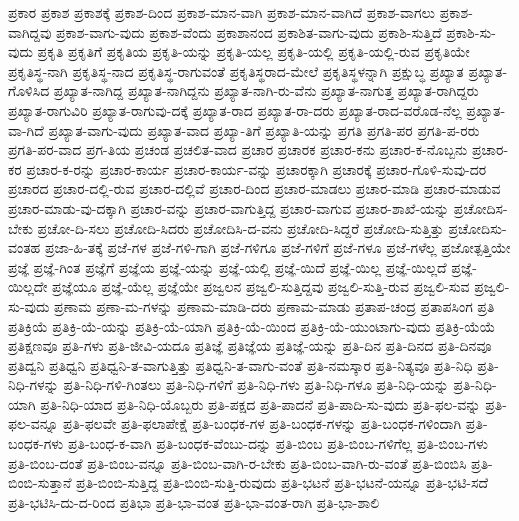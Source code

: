{ಪ್ರಕಾರ
ಪ್ರಕಾಶ
ಪ್ರಕಾಶಕ್ಕೆ
ಪ್ರಕಾಶ-ದಿಂದ
ಪ್ರಕಾಶ-ಮಾನ-ವಾಗಿ
ಪ್ರಕಾಶ-ಮಾನ-ವಾಗಿದೆ
ಪ್ರಕಾಶ-ವಾಗಲು
ಪ್ರಕಾಶ-ವಾಗಿದ್ದವು
ಪ್ರಕಾಶ-ವಾಗು-ವುದು
ಪ್ರಕಾಶ-ವೆಂದು
ಪ್ರಕಾಶಾನಂದ
ಪ್ರಕಾಶಿತ-ವಾಗು-ವುದು
ಪ್ರಕಾಶಿ-ಸುತ್ತಿದೆ
ಪ್ರಕಾಶಿ-ಸು-ವುದು
ಪ್ರಕೃತಿ
ಪ್ರಕೃತಿಗೆ
ಪ್ರಕೃತಿಯ
ಪ್ರಕೃತಿ-ಯನ್ನು
ಪ್ರಕೃತಿ-ಯಲ್ಲ
ಪ್ರಕೃತಿ-ಯಲ್ಲಿ
ಪ್ರಕೃತಿ-ಯಲ್ಲಿ-ರುವ
ಪ್ರಕೃತಿಯೇ
ಪ್ರಕೃತಿಸ್ಥ-ನಾಗಿ
ಪ್ರಕೃತಿಸ್ಥ-ನಾದ
ಪ್ರಕೃತಿಸ್ಥ-ರಾಗುವಂತೆ
ಪ್ರಕೃತಿಸ್ಥರಾದ-ಮೇಲೆ
ಪ್ರಕೃತಿಸ್ಥಳನ್ನಾಗಿ
ಪ್ರಕ್ಷುಬ್ಧ
ಪ್ರಖ್ಯಾತ
ಪ್ರಖ್ಯಾತ-ಗೊಳಿಸಿದ
ಪ್ರಖ್ಯಾತ-ನಾಗಿದ್ದ
ಪ್ರಖ್ಯಾತ-ನಾಗಿದ್ದನು
ಪ್ರಖ್ಯಾತ-ನಾಗಿ-ರು-ವೆನು
ಪ್ರಖ್ಯಾತ-ನಾಗುತ್ತ
ಪ್ರಖ್ಯಾತ-ರಾಗಿದ್ದರು
ಪ್ರಖ್ಯಾತ-ರಾಗುವಿರಿ
ಪ್ರಖ್ಯಾತ-ರಾಗುವು-ದಕ್ಕೆ
ಪ್ರಖ್ಯಾತ-ರಾದ
ಪ್ರಖ್ಯಾತ-ರಾ-ದರು
ಪ್ರಖ್ಯಾತ-ರಾದ-ವರೊಡ-ನೆಲ್ಲ
ಪ್ರಖ್ಯಾತ-ವಾ-ಗಿದೆ
ಪ್ರಖ್ಯಾತ-ವಾಗು-ವುದು
ಪ್ರಖ್ಯಾತ-ವಾದ
ಪ್ರಖ್ಯಾ-ತಿಗೆ
ಪ್ರಖ್ಯಾತಿ-ಯನ್ನು
ಪ್ರಗತಿ
ಪ್ರಗತಿ-ಪರ
ಪ್ರಗತಿ-ಪ-ರರು
ಪ್ರಗತಿ-ಪರ-ವಾದ
ಪ್ರಗ-ತಿಯ
ಪ್ರಚಂಡ
ಪ್ರಚಲಿತ-ವಾದ
ಪ್ರಚಾರ
ಪ್ರಚಾರಕ
ಪ್ರಚಾರ-ಕನು
ಪ್ರಚಾರ-ಕ-ನೊಬ್ಬನು
ಪ್ರಚಾರ-ಕರ
ಪ್ರಚಾರ-ಕ-ರನ್ನು
ಪ್ರಚಾರ-ಕಾರ್ಯ
ಪ್ರಚಾರ-ಕಾರ್ಯ-ವನ್ನು
ಪ್ರಚಾರಕ್ಕಾಗಿ
ಪ್ರಚಾರಕ್ಕೆ
ಪ್ರಚಾರ-ಗೊಳಿ-ಸುವು-ದರ
ಪ್ರಚಾರದ
ಪ್ರಚಾರ-ದಲ್ಲಿ-ರುವ
ಪ್ರಚಾರ-ದಲ್ಲಿವೆ
ಪ್ರಚಾರ-ದಿಂದ
ಪ್ರಚಾರ-ಮಾಡಲು
ಪ್ರಚಾರ-ಮಾಡಿ
ಪ್ರಚಾರ-ಮಾಡುವ
ಪ್ರಚಾರ-ಮಾಡು-ವು-ದಕ್ಕಾಗಿ
ಪ್ರಚಾರ-ವನ್ನು
ಪ್ರಚಾರ-ವಾಗುತ್ತಿದ್ದ
ಪ್ರಚಾರ-ವಾಗುವ
ಪ್ರಚಾರ-ಶಾಖೆ-ಯನ್ನು
ಪ್ರಚೋದಿಸ-ಬೇಕು
ಪ್ರಚೋ-ದಿ-ಸಲು
ಪ್ರಚೋದಿ-ಸಿದರು
ಪ್ರಚೋದಿಸಿ-ದ-ವನು
ಪ್ರಚೋದಿ-ಸಿದ್ದರೆ
ಪ್ರಚೋದಿ-ಸುತ್ತಿತ್ತು
ಪ್ರಚೋದಿಸು-ವಂತಹ
ಪ್ರಜಾ-ಹಿ-ತಕ್ಕೆ
ಪ್ರಜೆ-ಗಳ
ಪ್ರಜೆ-ಗಳಿ-ಗಾಗಿ
ಪ್ರಜೆ-ಗಳಿಗೂ
ಪ್ರಜೆ-ಗಳಿಗೆ
ಪ್ರಜೆ-ಗಳೂ
ಪ್ರಜೆ-ಗಳೆಲ್ಲ
ಪ್ರಜೋತ್ಪತ್ತಿಯೇ
ಪ್ರಜ್ಞೆ
ಪ್ರಜ್ಞೆ-ಗಿಂತ
ಪ್ರಜ್ಞೆಗೆ
ಪ್ರಜ್ಞೆಯ
ಪ್ರಜ್ಞೆ-ಯನ್ನು
ಪ್ರಜ್ಞೆ-ಯಲ್ಲಿ
ಪ್ರಜ್ಞೆ-ಯಿದೆ
ಪ್ರಜ್ಞೆ-ಯಿಲ್ಲ
ಪ್ರಜ್ಞೆ-ಯಿಲ್ಲದೆ
ಪ್ರಜ್ಞೆ-ಯಿಲ್ಲದೇ
ಪ್ರಜ್ಞೆಯೂ
ಪ್ರಜ್ಞೆ-ಯೆಲ್ಲ
ಪ್ರಜ್ಞೆಯೇ
ಪ್ರಜ್ವಲನ
ಪ್ರಜ್ವಲಿ-ಸುತ್ತಿದ್ದವು
ಪ್ರಜ್ವಲಿ-ಸುತ್ತಿ-ರುವ
ಪ್ರಜ್ವಲಿ-ಸುವ
ಪ್ರಜ್ವಲಿ-ಸು-ವುದು
ಪ್ರಣಾಮ
ಪ್ರಣಾ-ಮ-ಗಳನ್ನು
ಪ್ರಣಾಮ-ಮಾಡಿ-ದರು
ಪ್ರಣಾಮ-ಮಾಡು
ಪ್ರತಾಪ-ಚಂದ್ರ
ಪ್ರತಾಪಸಿಂಗ
ಪ್ರತಿ
ಪ್ರತಿಕ್ರಿಯೆ
ಪ್ರತಿಕ್ರಿ-ಯೆ-ಯನ್ನು
ಪ್ರತಿಕ್ರಿ-ಯೆ-ಯಾಗಿ
ಪ್ರತಿಕ್ರಿ-ಯೆ-ಯಿಂದ
ಪ್ರತಿಕ್ರಿ-ಯೆ-ಯುಂಟಾಗು-ವುದು
ಪ್ರತಿಕ್ರಿ-ಯೆಯೆ
ಪ್ರತಿಕ್ಷಣವೂ
ಪ್ರತಿ-ಗಳು
ಪ್ರತಿ-ಜೀವಿ-ಯದೂ
ಪ್ರತಿಜ್ಞೆ
ಪ್ರತಿಜ್ಞೆಯ
ಪ್ರತಿಜ್ಞೆ-ಯನ್ನು
ಪ್ರತಿ-ದಿನ
ಪ್ರತಿ-ದಿನದ
ಪ್ರತಿ-ದಿನವೂ
ಪ್ರತಿದ್ವನಿ
ಪ್ರತಿಧ್ವನಿ
ಪ್ರತಿಧ್ವನಿ-ತ-ವಾಗುತ್ತಿತ್ತು
ಪ್ರತಿಧ್ವನಿ-ತ-ವಾಗು-ವಂತೆ
ಪ್ರತಿ-ನಮಸ್ಕಾರ
ಪ್ರತಿ-ನಿತ್ಯವೂ
ಪ್ರತಿ-ನಿಧಿ
ಪ್ರತಿ-ನಿಧಿ-ಗಳನ್ನು
ಪ್ರತಿ-ನಿಧಿ-ಗಳಿ-ಗಿಂತಲು
ಪ್ರತಿ-ನಿಧಿ-ಗಳಿಗೆ
ಪ್ರತಿ-ನಿಧಿ-ಗಳು
ಪ್ರತಿ-ನಿಧಿ-ಗಳೂ
ಪ್ರತಿ-ನಿಧಿ-ಯನ್ನು
ಪ್ರತಿ-ನಿಧಿ-ಯಾಗಿ
ಪ್ರತಿ-ನಿಧಿ-ಯಾದ
ಪ್ರತಿ-ನಿಧಿ-ಯೊಬ್ಬರು
ಪ್ರತಿ-ಪಕ್ಷದ
ಪ್ರತಿ-ಪಾದನೆ
ಪ್ರತಿ-ಪಾದಿ-ಸು-ವುದು
ಪ್ರತಿ-ಫಲ-ವನ್ನು
ಪ್ರತಿ-ಫಲ-ವನ್ನೂ
ಪ್ರತಿ-ಫಲವೇ
ಪ್ರತಿ-ಫಲಾಪೇಕ್ಷೆ
ಪ್ರತಿ-ಬಂಧಕ-ಗಳ
ಪ್ರತಿ-ಬಂಧಕ-ಗಳನ್ನು
ಪ್ರತಿ-ಬಂಧಕ-ಗಳಿಂದಾಗಿ
ಪ್ರತಿ-ಬಂಧಕ-ಗಳು
ಪ್ರತಿ-ಬಂಧ-ಕ-ವಾಗಿ
ಪ್ರತಿ-ಬಂಧಕ-ವೆಂಬು-ದನ್ನು
ಪ್ರತಿ-ಬಿಂಬ
ಪ್ರತಿ-ಬಿಂಬ-ಗಳಿಗೆಲ್ಲ
ಪ್ರತಿ-ಬಿಂಬ-ಗಳು
ಪ್ರತಿ-ಬಿಂಬ-ದಂತೆ
ಪ್ರತಿ-ಬಿಂಬ-ವನ್ನೂ
ಪ್ರತಿ-ಬಿಂಬ-ವಾಗಿ-ರ-ಬೇಕು
ಪ್ರತಿ-ಬಿಂಬ-ವಾಗಿ-ರು-ವಂತೆ
ಪ್ರತಿ-ಬಿಂಬಿಸಿ
ಪ್ರತಿ-ಬಿಂಬಿ-ಸುತ್ತಾನೆ
ಪ್ರತಿ-ಬಿಂಬಿ-ಸುತ್ತಿದ್ದ
ಪ್ರತಿ-ಬಿಂಬಿ-ಸುತ್ತಿ-ರುವುದು
ಪ್ರತಿ-ಭಟನೆ
ಪ್ರತಿ-ಭಟನೆ-ಯನ್ನೂ
ಪ್ರತಿ-ಭಟಿ-ಸದೆ
ಪ್ರತಿ-ಭಟಿಸಿ-ದು-ದ-ರಿಂದ
ಪ್ರತಿಭಾ
ಪ್ರತಿ-ಭಾ-ವಂತ
ಪ್ರತಿ-ಭಾ-ವಂತ-ರಾಗಿ
ಪ್ರತಿ-ಭಾ-ಶಾಲಿ
}
